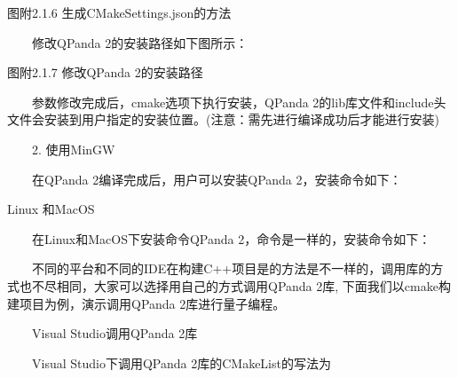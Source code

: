 \documentclass[a4paper,11pt,english]{sphinxmanual}
\begin{document}

\begin{center}图附2.1.6 生成CMakeSettings.json的方法
\end{center}
\sphinxAtStartPar
​  修改QPanda 2的安装路径如下图所示：


\begin{center}图附2.1.7 修改QPanda 2的安装路径
\end{center}
\sphinxAtStartPar
​  参数修改完成后，cmake选项下执行安装，QPanda 2的lib库文件和include头文件会安装到用户指定的安装位置。(注意：需先进行编译成功后才能进行安装)

\sphinxAtStartPar
  2. 使用MinGW

\sphinxAtStartPar
​  在QPanda 2编译完成后，用户可以安装QPanda 2，安装命令如下：

\begin{sphinxVerbatim}[commandchars=\\\{\}]
 
\end{sphinxVerbatim}

\sphinxAtStartPar
Linux 和MacOS

\sphinxAtStartPar
​  在Linux和MacOS下安装命令QPanda 2，命令是一样的，安装命令如下：

\begin{sphinxVerbatim}[commandchars=\\\{\}]
  
\end{sphinxVerbatim}

\sphinxAtStartPar
{}

\sphinxAtStartPar
​  不同的平台和不同的IDE在构建C++项目是的方法是不一样的，调用库的方式也不尽相同，大家可以选择用自己的方式调用QPanda 2库, 下面我们以cmake构建项目为例，演示调用QPanda 2库进行量子编程。

\sphinxAtStartPar
​  Visual Studio调用QPanda 2库

\sphinxAtStartPar
​  Visual Studio下调用QPanda 2库的CMakeList的写法为
\end{document}
